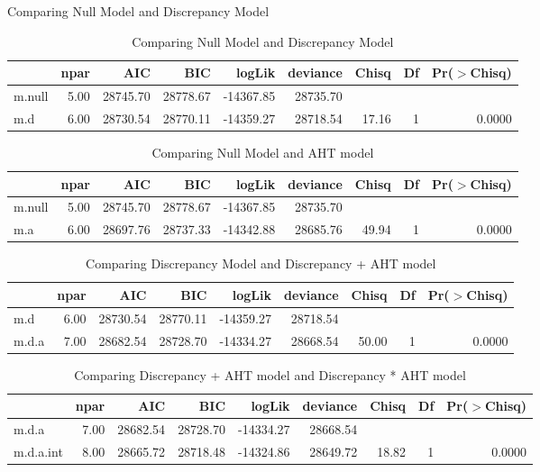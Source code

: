 \caption{Comparing Null Model and Discrepancy Model}

\begin{table}[H]
\centering
\begin{tabular}{lrrrrrrrr}
  \hline
 & npar & AIC & BIC & logLik & deviance & Chisq & Df & Pr($>$Chisq) \\ 
  \hline
m.null & 5.00 & 28745.70 & 28778.67 & -14367.85 & 28735.70 &  &  &  \\ 
  m.d & 6.00 & 28730.54 & 28770.11 & -14359.27 & 28718.54 & 17.16 & 1 & 0.0000 \\ 
   \hline
\end{tabular}
\caption{Comparing Null Model and Discrepancy Model}
\end{table}


\begin{table}[H]
\centering
\begin{tabular}{lrrrrrrrr}
  \hline
 & npar & AIC & BIC & logLik & deviance & Chisq & Df & Pr($>$Chisq) \\ 
  \hline
m.null & 5.00 & 28745.70 & 28778.67 & -14367.85 & 28735.70 &  &  &  \\ 
  m.a & 6.00 & 28697.76 & 28737.33 & -14342.88 & 28685.76 & 49.94 & 1 & 0.0000 \\ 
   \hline
\end{tabular}
\caption{Comparing Null Model and AHT model}
\end{table}


\begin{table}[H]
\centering
\begin{tabular}{lrrrrrrrr}
  \hline
 & npar & AIC & BIC & logLik & deviance & Chisq & Df & Pr($>$Chisq) \\ 
  \hline
m.d & 6.00 & 28730.54 & 28770.11 & -14359.27 & 28718.54 &  &  &  \\ 
  m.d.a & 7.00 & 28682.54 & 28728.70 & -14334.27 & 28668.54 & 50.00 & 1 & 0.0000 \\ 
   \hline
\end{tabular}
\caption{Comparing Discrepancy Model and Discrepancy + AHT model}
\end{table}

\begin{table}[H]
\centering
\begin{tabular}{lrrrrrrrr}
  \hline
 & npar & AIC & BIC & logLik & deviance & Chisq & Df & Pr($>$Chisq) \\ 
  \hline
m.d.a & 7.00 & 28682.54 & 28728.70 & -14334.27 & 28668.54 &  &  &  \\ 
  m.d.a.int & 8.00 & 28665.72 & 28718.48 & -14324.86 & 28649.72 & 18.82 & 1 & 0.0000 \\ 
   \hline
\end{tabular}
\caption{Comparing Discrepancy + AHT model and Discrepancy * AHT model}
\end{table}
